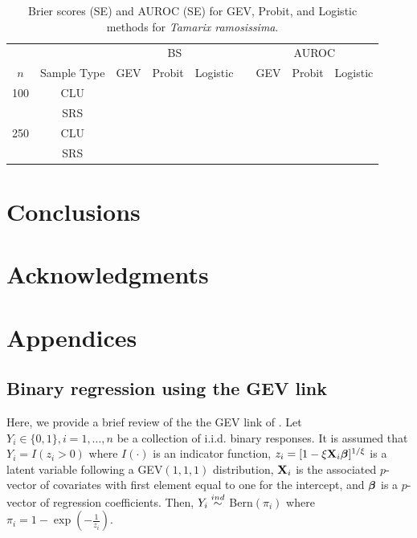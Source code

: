 \documentclass[11pt]{article}
\begin{document}
\begin{table}
  \caption{Brier scores (SE) and AUROC (SE) for GEV, Probit, and Logistic methods for \emph{Tamarix ramosissima}.}
  \label{rbtbl:simbsresults}
  \centering
  \begin{tabular}{cclllclll}
  \toprule
    \multicolumn{2}{c}{ }& \multicolumn{3}{c}{BS} & \phantom{abc} & \multicolumn{3}{c}{AUROC}\\
    \cmidrule{3-5} \cmidrule{7-9}
    \multicolumn{1}{c}{$n$} & \multicolumn{1}{c}{Sample Type} & GEV    & Probit & Logistic & \phantom{abc} & GEV    & Probit & Logistic \\
  \midrule
  100 & CLU &  &  &  &&  &  &\\
      & SRS &  &  &  &&  &  &\\
  250 & CLU &  &  &  &&  &  &\\
      & SRS &  &  &  &&  &  &\\
  \bottomrule
  \end{tabular}
\end{table}

\section{Conclusions}\label{rbs:conclusions}

\section*{Acknowledgments}

\appendix
\section{Appendices}
\subsection{Binary regression using the GEV link} \label{rba:rarebinary}
Here, we provide a brief review of the the GEV link of \citet{Wang2010}.
Let $Y_i \in \{0, 1\}, i = 1, \ldots, n$ be a collection of i.i.d. binary responses.
It is assumed that $Y_i = I(z_i > 0)$ where $I(\cdot)$ is an indicator function, $z_i = [1 - \xi \mbox{\bf X}_i \mbox{\boldmath $\beta$}]^{1 / \xi}$ is a latent variable following a GEV$(1, 1, 1)$ distribution, $\mbox{\bf X}_i$ is the associated $p$-vector of covariates with first element equal to one for the intercept, and $\mbox{\boldmath $\beta$}$ is a $p$-vector of regression coefficients.
Then, $Y_i \stackrel{ind}{\sim}$ Bern$(\pi_i)$ where $\pi_i= 1 - \exp \left( -\frac{ 1 }{ z_i } \right)$.
\end{document}
